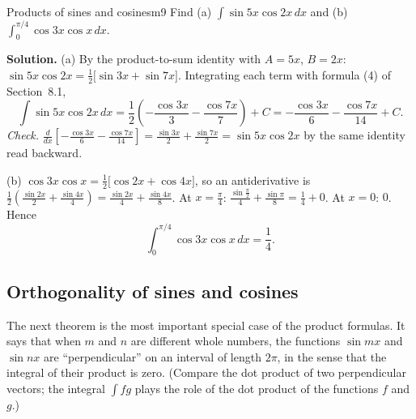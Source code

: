 \documentclass[11pt]{article}
\begin{document}
\begin{exmp}{Products of sines and cosines}{m9}
Find (a) $\int\sin5x\cos2x\,dx$ and (b) $\int_0^{\pi/4}\cos3x\cos x\,dx$.

\textbf{Solution.} (a) By the product-to-sum identity with $A=5x$, $B=2x$: $\sin5x\cos2x=\frac12\big[\sin3x+\sin7x\big]$. Integrating each term with formula (4) of Section~8.1,
\[\int\sin5x\cos2x\,dx=\frac12\left(-\frac{\cos3x}3-\frac{\cos7x}7\right)+C=-\frac{\cos3x}6-\frac{\cos7x}{14}+C .\]
\emph{Check.} $\frac{d}{dx}\left[-\frac{\cos3x}6-\frac{\cos7x}{14}\right]=\frac{\sin3x}2+\frac{\sin7x}2=\sin5x\cos2x$ by the same identity read backward.

(b) $\cos3x\cos x=\frac12\big[\cos2x+\cos4x\big]$, so an antiderivative is $\frac12\left(\frac{\sin2x}2+\frac{\sin4x}4\right)=\frac{\sin2x}4+\frac{\sin4x}8$. At $x=\frac\pi4$: $\frac{\sin\frac\pi2}4+\frac{\sin\pi}8=\frac14+0$. At $x=0$: $0$. Hence
\[\int_0^{\pi/4}\cos3x\cos x\,dx=\frac14 .\]
\end{exmp}

\subsection*{Orthogonality of sines and cosines}

The next theorem is the most important special case of the product formulas. It says that when $m$ and $n$ are different whole numbers, the functions $\sin mx$ and $\sin nx$ are ``perpendicular'' on an interval of length $2\pi$, in the sense that the integral of their product is zero. (Compare the dot product of two perpendicular vectors; the integral $\int fg$ plays the role of the dot product of the functions $f$ and $g$.)
\end{document}
